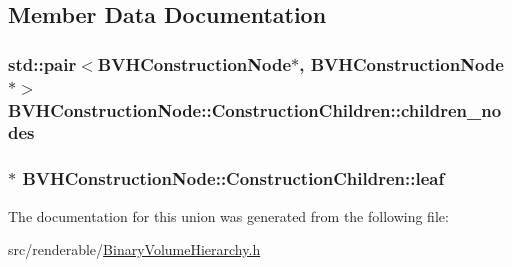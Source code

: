 \subsection{Member Data Documentation}
\subsubsection[{\texorpdfstring{children\+\_\+nodes}{children_nodes}}]{\setlength{\rightskip}{0pt plus 5cm}std\+::pair$<${\bf B\+V\+H\+Construction\+Node}$\ast$, {\bf B\+V\+H\+Construction\+Node}$\ast$$>$ B\+V\+H\+Construction\+Node\+::\+Construction\+Children\+::children\+\_\+nodes}\hypertarget{unionBVHConstructionNode_1_1ConstructionChildren_ac5e7d56943ed00d7165259481d7cb005}{}\label{unionBVHConstructionNode_1_1ConstructionChildren_ac5e7d56943ed00d7165259481d7cb005}
\subsubsection[{\texorpdfstring{leaf}{leaf}}]{$\ast$ B\+V\+H\+Construction\+Node\+::\+Construction\+Children\+::leaf}\hypertarget{unionBVHConstructionNode_1_1ConstructionChildren_abd717eefbb1140cd74ab66c49771b728}{}\label{unionBVHConstructionNode_1_1ConstructionChildren_abd717eefbb1140cd74ab66c49771b728}


The documentation for this union was generated from the following file\+:\begin{DoxyCompactItemize}
\item 
src/renderable/\hyperlink{BinaryVolumeHierarchy_8h}{Binary\+Volume\+Hierarchy.\+h}\end{DoxyCompactItemize}

